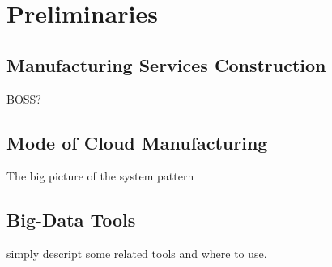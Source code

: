 \section{Preliminaries} %
\subsection{Manufacturing Services Construction}
BOSS?

\subsection{Mode of Cloud Manufacturing}
The big picture of the system pattern

\subsection{Big-Data Tools}
simply descript some related tools and where to use.